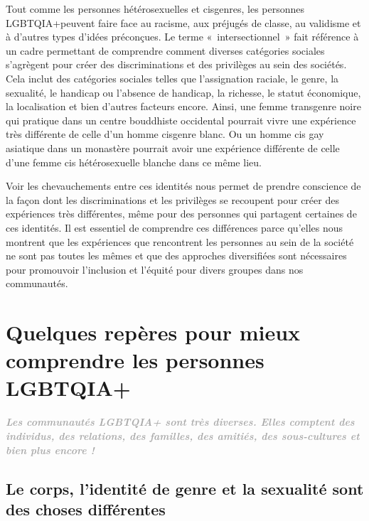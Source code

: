 \documentclass[12pt,openany]{book}
\renewenvironment{quote}{%
  \list{}{%
    \leftmargin-0.1cm   %
    \rightmargin\leftmargin
  }
  \item\relax
}
{\endlist}
\begin{document}
\noindent Tout comme les personnes hétérosexuelles et cisgenres, les personnes \mbox{LGBTQIA+}peuvent faire face au racisme, aux préjugés de classe, au validisme et à d’autres types d’idées préconçues. Le terme \mbox{« intersectionnel »} fait référence à un cadre permettant de comprendre comment diverses catégories sociales s’agrègent pour créer des discriminations et des privilèges au sein des sociétés. Cela inclut des catégories sociales telles que l’assignation raciale, le genre, la sexualité, le handicap ou l’absence de handicap, la richesse, le statut économique, la localisation et bien d’autres facteurs encore. Ainsi, une femme transgenre noire qui pratique dans un centre bouddhiste occidental pourrait vivre une expérience très différente de celle d’un homme cisgenre blanc. Ou un homme cis gay asiatique dans un monastère pourrait avoir une expérience différente de celle d’une femme cis hétérosexuelle blanche dans ce même lieu.

Voir les chevauchements entre ces identités nous permet de prendre conscience de la façon dont les discriminations et les privilèges se recoupent pour créer des expériences très différentes, même pour des personnes qui partagent certaines de ces identités. Il est essentiel de comprendre ces différences parce qu’elles nous montrent que les expériences que rencontrent les personnes au sein de la société ne sont pas toutes les mêmes et que des approches diversifiées sont nécessaires pour promouvoir l’inclusion et l’équité pour divers groupes dans nos communautés.

\chapter*{Quelques repères pour mieux comprendre les personnes \mbox{LGBTQIA+}}

\begingroup
\begin{quote}
\centering
\doublespacing
\textit{\large \textbf{\textcolor{darkgray}{Les communautés \mbox{LGBTQIA+} sont très diverses. Elles comptent des individus, des relations, des familles, des amitiés, des sous-cultures et bien plus encore !}}}
\end{quote}
\endgroup

\section*{Le corps, l’identité de genre et la sexualité sont des choses différentes}
\end{document}
